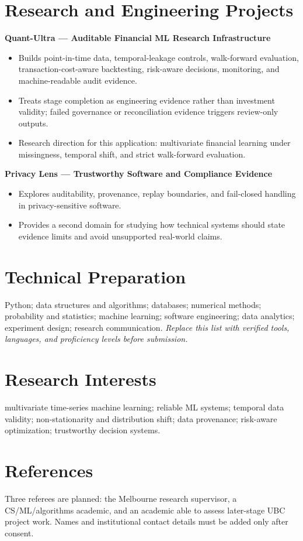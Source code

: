 \documentclass[11pt]{article}
\begin{document}
\section*{Research and Engineering Projects}
\textbf{Quant-Ultra --- Auditable Financial ML Research Infrastructure}
\begin{itemize}
\item Builds point-in-time data, temporal-leakage controls, walk-forward evaluation, transaction-cost-aware backtesting, risk-aware decisions, monitoring, and machine-readable audit evidence.
\item Treats stage completion as engineering evidence rather than investment validity; failed governance or reconciliation evidence triggers review-only outputs.
\item Research direction for this application: multivariate financial learning under missingness, temporal shift, and strict walk-forward evaluation.
\end{itemize}

\begin{samepage}
\textbf{Privacy Lens --- Trustworthy Software and Compliance Evidence}
\begin{itemize}
\item Explores auditability, provenance, replay boundaries, and fail-closed handling in privacy-sensitive software.
\item Provides a second domain for studying how technical systems should state evidence limits and avoid unsupported real-world claims.
\end{itemize}
\end{samepage}

\section*{Technical Preparation}
Python; data structures and algorithms; databases; numerical methods; probability and statistics; machine learning; software engineering; data analytics; experiment design; research communication. \textit{Replace this list with verified tools, languages, and proficiency levels before submission.}

\section*{Research Interests}
multivariate time-series machine learning; reliable ML systems; temporal data validity; non-stationarity and distribution shift; data provenance; risk-aware optimization; trustworthy decision systems.

\section*{References}
Three referees are planned: the Melbourne research supervisor, a CS/ML/algorithms academic, and an academic able to assess later-stage UBC project work. Names and institutional contact details must be added only after consent.
\end{document}
